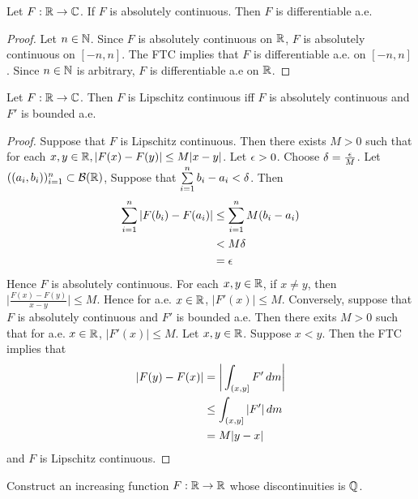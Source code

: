 \documentclass{book}
\begin{document}
	\begin{ex}  
		Let $F: \mathbb{R} \rightarrow \mathbb{C}$. If $F$ is absolutely continuous. Then $F$ is differentiable a.e.
	\end{ex}
	
	\begin{proof}
		Let $n \in \mathbb{N}$. Since $F$ is absolutely continuous on $\mathbb{R}$, $F$ is absolutely continuous on $[-n,n]$. The FTC implies that $F$ is differentiable a.e. on $[-n,n]$. Since $n \in \mathbb{N}$ is arbitrary, $F$ is differentiable a.e on $\mathbb{R}$.
	\end{proof}
	
	\begin{ex}  
		Let $F: \mathbb{R} \rightarrow \mathbb{C}$. Then $F$ is Lipschitz continuous iff $F$ is absolutely continuous and $F'$ is bounded a.e.
	\end{ex}
	
	\begin{proof}
		Suppose that $F$ is Lipschitz continuous. Then there exists $M>0$ such that for each $x,y \in \mathbb{R}, |F(x)-F(y)| \leq M|x-y|$. Let $\epsilon >0$. Choose $\delta = \frac{\epsilon}{M}$. Let $((a_i, b_i))_{i=1}^n \subset \mathcal{B}(\mathbb{R})$, Suppose that $\sum\limits_{i=1}^n b_i-a_i < \delta$. Then 
		\begin{align*}
			\sum\limits_{i=1}^n|F(b_i)-F(a_i)| 
			&\leq \sum\limits_{i=1}^n M(b_i - a_i)\\
			&< M\delta\\
			&= \epsilon
		\end{align*}
		Hence $F$ is absolutely continuous. For each $x, y \in \mathbb{R}$, if $x \neq y$, then $\bigg|\frac{F(x)-F(y)}{x-y}\bigg| \leq M$. Hence for a.e. $x \in \mathbb{R}$, $|F'(x)| \leq M$. Conversely, suppose that $F$ is absolutely continuous and $F'$ is bounded a.e. Then there exits $M> 0$ such that for a.e. $x \in \mathbb{R}$, $|F'(x)| \leq M$. Let $x,y \in \mathbb{R}$. Suppose $x<y$. Then the FTC implies that 
		\begin{align*}
			|F(y)-F(x)|
			& = \bigg|\int_{(x,y]}F'\, d m\bigg|\\
			&\leq \int_{(x,y]}|F'|\, d m\\
			&=M|y-x|
		\end{align*}
		and $F$ is Lipschitz continuous.
	\end{proof}
	
	\begin{ex}  
		Construct an increasing function $F: \mathbb{R} \rightarrow \mathbb{R}$ whose discontinuities is $\mathbb{Q}$.
	\end{ex}
	
\end{document}
